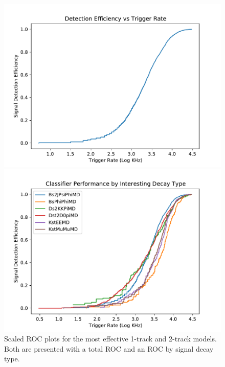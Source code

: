 \documentclass[12pt, letterpaper]{article}
\begin{document}
\begin{figure}
\begin{minipage}[b]{0.5\textwidth}
\includegraphics[width=1\textwidth]{2trackRoc.pdf}
\end{minipage}
\begin{minipage}[b]{0.5\textwidth}
\includegraphics[width=1\textwidth]{2trackDecayRoc.pdf}
\end{minipage}

\caption{Scaled ROC plots for the most effective 1-track and 2-track models. Both are presented with a total ROC and an ROC by signal decay type.}
\label{figure:decayRoc}
\end{figure}
\end{document}
